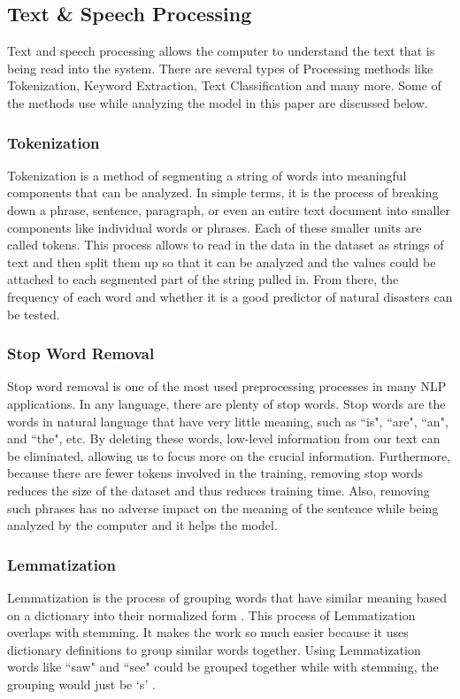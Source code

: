 \documentclass{article}
\begin{document}
\subsection{Text & Speech Processing}
Text and speech processing allows the computer to understand the text that is being read into the system. There are several types of Processing methods like Tokenization, Keyword Extraction, Text Classification and many more. Some of the methods use while analyzing the model in this paper are discussed below. 

\subsubsection{Tokenization}

Tokenization is a method of segmenting a string of words into meaningful components that can be analyzed. In simple terms, it is the process of breaking down a phrase, sentence, paragraph, or even an entire text document into smaller components like individual words or phrases. Each of these smaller units are called tokens. This process allows to read in the data in the dataset as strings of text and then split them up so that it can be analyzed and the values could be attached to each segmented part of the string pulled in. From there, the frequency of each word and whether it is a good predictor of natural disasters can be tested.



\subsubsection{Stop Word Removal}

Stop word removal is one of the most used preprocessing processes in many NLP applications. In any language, there are plenty of stop words. Stop words are the words in natural language that have very little meaning, such as ``is", ``are", ``an", and ``the", etc. By deleting these words, low-level information from our text can be eliminated, allowing us to focus more on the crucial information. Furthermore, because there are fewer tokens involved in the training, removing stop words reduces the size of the dataset and thus reduces training time. Also, removing such phrases has no adverse impact on the meaning of the sentence while being analyzed by the computer and it helps the model.


\subsubsection{Lemmatization}
Lemmatization is the process of grouping words that have similar meaning based on a dictionary into their normalized form \cite{3}. This process of Lemmatization overlaps with stemming. It makes the work so much easier because it uses dictionary definitions to group similar words together. Using Lemmatization words like ``saw" and ``see" could be grouped together while with stemming, the grouping would just be `s' \cite{4}.
\end{document}
